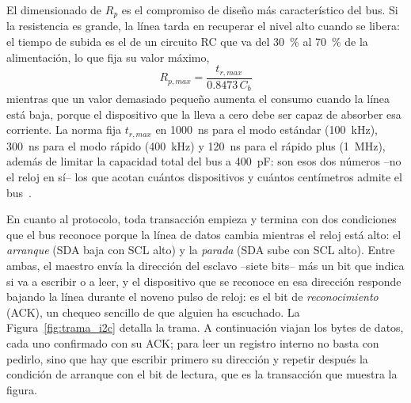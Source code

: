 El dimensionado de $R_p$ es el compromiso de diseño más característico del bus. Si la resistencia es grande, la línea tarda en recuperar el nivel alto cuando se libera: el tiempo de subida es el de un circuito RC que va del \SI{30}{\percent} al \SI{70}{\percent} de la alimentación, lo que fija su valor máximo,
\begin{equation}\label{eq:i2c_pullup}
    R_{p,max} = \frac{t_{r,max}}{0.8473\,C_b}
\end{equation}
mientras que un valor demasiado pequeño aumenta el consumo cuando la línea está baja, porque el dispositivo que la lleva a cero debe ser capaz de absorber esa corriente. La norma fija $t_{r,max}$ en \SI{1000}{\nano\second} para el modo estándar (\SI{100}{\kilo\hertz}), \SI{300}{\nano\second} para el modo rápido (\SI{400}{\kilo\hertz}) y \SI{120}{\nano\second} para el rápido plus (\SI{1}{\mega\hertz}), además de limitar la capacidad total del bus a \SI{400}{\pico\farad}: son esos dos números --no el reloj en sí-- los que acotan cuántos dispositivos y cuántos centímetros admite el bus~\cite{nxp_um10204}.

En cuanto al protocolo, toda transacción empieza y termina con dos condiciones que el bus reconoce porque la línea de datos cambia mientras el reloj está alto: el \emph{arranque} (SDA baja con SCL alto) y la \emph{parada} (SDA sube con SCL alto). Entre ambas, el maestro envía la dirección del esclavo --siete bits-- más un bit que indica si va a escribir o a leer, y el dispositivo que se reconoce en esa dirección responde bajando la línea durante el noveno pulso de reloj: es el bit de \emph{reconocimiento} (ACK), un chequeo sencillo de que alguien ha escuchado. La Figura~\ref{fig:trama_i2c} detalla la trama. A continuación viajan los bytes de datos, cada uno confirmado con su ACK; para leer un registro interno no basta con pedirlo, sino que hay que escribir primero su dirección y repetir después la condición de arranque con el bit de lectura, que es la transacción que muestra la figura.

